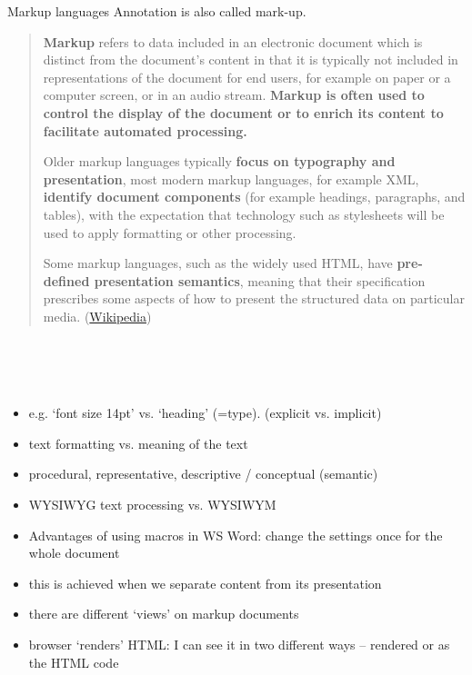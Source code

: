 \begin{frame}[allowframebreaks]{Markup languages}
Annotation is also called mark-up. 

\begin{quote}
\textbf{Markup} refers to data included in an electronic document which is distinct from the document's content in that it is typically not included in representations of the document for end users, for example on paper or a computer screen, or in an audio stream. \textbf{Markup is often used to control the display of the document or to enrich its content to facilitate automated processing.}\smallskip

Older markup languages \punkti typically \textbf{focus on typography and presentation}, \punkti most modern markup languages, for example XML, \textbf{identify document components} (for example headings, paragraphs, and tables), with the expectation that technology such as stylesheets will be used to apply formatting or other processing.\smallskip

Some markup languages, such as the widely used HTML, have \textbf{pre-defined presentation semantics}, meaning that their specification prescribes some aspects of how to present the structured data on particular media. (\href{https://en.wikipedia.org/wiki/Markup_language}{Wikipedia})
\end{quote}

\\
~ ~ ~  \\
 \\


\begin{itemize}\footnotesize
    \item e.g. `font size 14pt' vs. `heading' (=type). (explicit vs. implicit)
    \item text formatting vs. meaning of the text 
    \item procedural, representative, descriptive / conceptual (semantic)
    \item WYSIWYG text processing  vs. WYSIWYM
    \item Advantages of using macros in WS Word: change the settings once for the whole document
    \item this is achieved when we separate content from its presentation
    \item there are different `views' on markup documents
    \item browser `renders' HTML: I can see it in two different ways -- rendered or as the HTML code
\end{itemize}



\end{frame}
